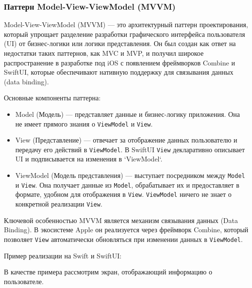 \documentclass[14pt, russian]{scrartcl}
\begin{document}
\subsubsection{Паттерн Model-View-ViewModel (MVVM)}

Model-View-ViewModel (MVVM) — это архитектурный паттерн проектирования, который упрощает разделение разработки графического интерфейса пользователя (UI) от бизнес-логики или логики представления. Он был создан как ответ на недостатки таких паттернов, как MVC и MVP, и получил широкое распространение в разработке под iOS с появлением фреймворков Combine и SwiftUI, которые обеспечивают нативную поддержку для связывания данных (data binding).

Основные компоненты паттерна:
\begin{itemize}
    \item Model (Модель) — представляет данные и бизнес-логику приложения. Она не имеет прямого знания о \texttt{ViewModel} и \texttt{View}.
    \item View (Представление) — отвечает за отображение данных пользователю и передачу его действий в \texttt{ViewModel}. В SwiftUI \texttt{View} декларативно описывает UI и подписывается на изменения в `ViewModel`.
    \item ViewModel (Модель представления) — выступает посредником между \texttt{Model} и \texttt{View}. Она получает данные из \texttt{Model}, обрабатывает их и предоставляет в формате, удобном для отображения в \texttt{View}. \texttt{ViewModel} ничего не знает о конкретной реализации \texttt{View}.
\end{itemize}

Ключевой особенностью MVVM является механизм связывания данных (Data Binding). В экосистеме Apple он реализуется через фреймворк Combine, который позволяет \texttt{View} автоматически обновляться при изменении данных в \texttt{ViewModel}.

Пример реализации на Swift и SwiftUI:

В качестве примера рассмотрим экран, отображающий информацию о пользователе.
\end{document}

